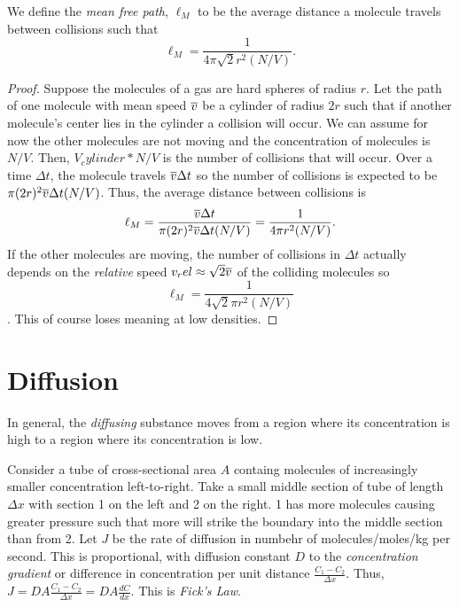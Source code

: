 \begin{definition}
    We define the \emph{mean free path}, $\ell_M$ to be the average distance a molecule travels between collisions such that $$\ell_M = \frac{1}{4\pi\sqrt{2}r^2(N/V)}.$$
\end{definition}
\begin{proof}
    Suppose the molecules of a gas are hard spheres of radius $r$. Let the path of one molecule with mean speed $\overline{v}$ be a cylinder of radius $2r$ such that if another molecule's center lies in the cylinder a collision will occur. We can assume for now the other molecules are not moving and the concentration of molecules is $N/V$. Then, $V_cylinder * N/V$ is the number of collisions that will occur. Over a time $\Delta t$, the molecule travels $\overline{v}\Delta t$ so the number of collisions is expected to be $\pi(2r)^2\overline{v}\Delta t(N/V)$. Thus, the average distance between collisions is $$\ell_M = \frac{\overline{v}\Delta t}{\pi(2r)^2\overline{v}\Delta t(N/V)} = \frac{1}{4\pi r^2(N/V)}.$$ If the other molecules are moving, the number of collisions in $\Delta t$ actually depends on the \emph{relative} speed $v_rel \approx \sqrt{2}\overline{v}$ of the colliding molecules so $$\ell_M = \frac{1}{4\sqrt{2}\pi r^2(N/V)}$$. This of course loses meaning at low densities.
\end{proof}

\section{Diffusion}

\begin{definition}[Diffusion]
    In general, the \emph{diffusing} substance moves from a region where its concentration is high to a region where its concentration is low.
\end{definition}
\begin{definition}
    Consider a tube of cross-sectional area $A$ containg molecules of increasingly smaller concentration left-to-right. Take a small middle section of tube of length $\Delta x$ with section 1 on the left and 2 on the right. 1 has more molecules causing greater pressure such that more will strike the boundary into the middle section than from 2. Let $J$ be the rate of diffusion in numbehr of molecules/moles/kg per second. This is proportional, with diffusion constant $D$ to the \emph{concentration gradient} or difference in concentration per unit distance $\frac{C_1-C_2}{\Delta x}$. Thus, $J = DA\frac{C_1-C_2}{\Delta x} = DA\frac{dC}{dx}$. This is \emph{Fick's Law}.
\end{definition}